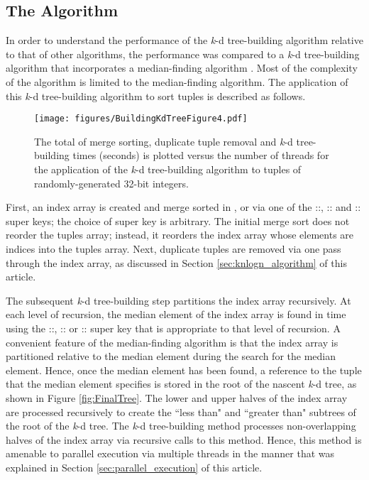 \documentclass{sig-alternate}
\begin{document}
\subsection{The  Algorithm}
\label{sec:nlogn_algorithm}

In order to understand the performance of the  \emph{k}-d tree-building algorithm relative to that of other algorithms, the performance was compared to a  \emph{k}-d tree-building algorithm that incorporates a  median-finding algorithm \cite{Blum}.  Most of the complexity of the  algorithm is limited to the  median-finding algorithm.  The application of this  \emph{k}-d tree-building algorithm to sort  tuples is described as follows.

\begin{figure}[h!]
\centering
\centerline{\texttt{[image: figures/BuildingKdTreeFigure4.pdf]}}
\caption{The total of merge sorting, duplicate tuple removal and \emph{k}-d tree-building times (seconds) is plotted versus the number of threads for the application of the  \emph{k}-d tree-building algorithm to    tuples of randomly-generated 32-bit integers.}
\label{fig:BuildingParallel}
\end{figure}

First, an index array is created and merge sorted in ,  or  via one of the ::, :: and :: super keys; the choice of super key is arbitrary.  The initial merge sort does not reorder the tuples array; instead, it reorders the index array whose elements are indices into the tuples array.  Next, duplicate  tuples are removed via one pass through the index array, as discussed in Section \ref{sec:knlogn_algorithm} of this article.

The subsequent \emph{k}-d tree-building step partitions the index array recursively.  At each level of recursion, the median element of the index array is found in  time using the ::, :: or :: super key that is appropriate to that level of recursion.  A convenient feature of the  median-finding algorithm is that the index array is partitioned relative to the median element during the search for the median element.  Hence, once the median element has been found, a reference to the  tuple that the median element specifies is stored in the root of the nascent \emph{k}-d tree, as shown in Figure \ref{fig:FinalTree}.  The lower and upper halves of the index array are processed recursively to create the ``less than" and ``greater than" subtrees of the root of the \emph{k}-d tree.  The  \emph{k}-d tree-building method processes non-overlapping halves of the index array via recursive calls to this method.  Hence, this method is amenable to parallel execution via multiple threads in the manner that was explained in Section \ref{sec:parallel_execution} of this article.
\end{document}
